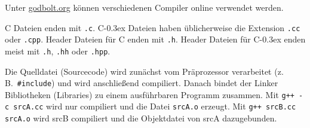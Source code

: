 \documentclass[10pt,twocolumn]{scrartcl}
\newcommand*\cpp{C\kern-0.3ex\raisebox{0.17ex}{\texttt{+\kern-0.3ex+}}}
\begin{document}
Unter \href{https://godbolt.org/}{godbolt.org} können verschiedenen Compiler online verwendet werden.

C Dateien enden mit \lstinline|.c|. \cpp{} Dateien haben üblicherweise die
Extension \lstinline|.cc| oder \lstinline|.cpp|. Header Dateien für C enden mit
\lstinline|.h|. Header Dateien für \cpp{} enden meist mit \lstinline|.h|,
\lstinline|.hh| oder \lstinline|.hpp|.

Die Quelldatei (Sourcecode) wird zunächst vom Präprozessor verarbeitet (z.\,B.\
\lstinline|#include|) und wird anschließend compiliert. Danach bindet der Linker
Bibliotheken (Libraries) zu einem ausführbaren Programm zusammen. Mit
\lstinline|g++ -c srcA.cc| wird nur compiliert und die Datei \lstinline|srcA.o|
erzeugt. Mit \lstinline|g++ srcB.cc srcA.o| wird srcB compiliert und die
Objektdatei von srcA dazugebunden.















%
%
%
%
%











\end{document}
